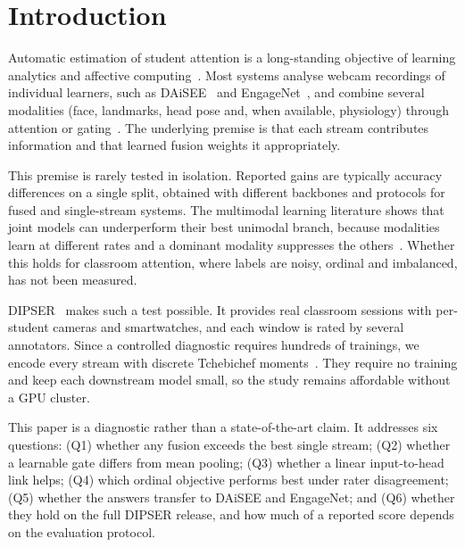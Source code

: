 \section{Introduction}
\label{sec:intro}

Automatic estimation of student attention is a long-standing objective of learning analytics and affective computing~\cite{whitehill2014faces,chango2022datafusionmmla}. Most systems analyse webcam recordings of individual learners, such as DAiSEE~\cite{gupta2016daisee} and EngageNet~\cite{singh2023engagenet}, and combine several modalities (face, landmarks, head pose and, when available, physiology) through attention or gating~\cite{baltrusaitis2019multimodal,arevalo2017gated,tran2026ordinal}. The underlying premise is that each stream contributes information and that learned fusion weights it appropriately.

This premise is rarely tested in isolation. Reported gains are typically accuracy differences on a single split, obtained with different backbones and protocols for fused and single-stream systems. The multimodal learning literature shows that joint models can underperform their best unimodal branch, because modalities learn at different rates and a dominant modality suppresses the others~\cite{wang2020makes,peng2022balanced}. Whether this holds for classroom attention, where labels are noisy, ordinal and imbalanced, has not been measured.

DIPSER~\cite{marquezcarpintero2025dipser} makes such a test possible. It provides real classroom sessions with per-student cameras and smartwatches, and each window is rated by several annotators. Since a controlled diagnostic requires hundreds of trainings, we encode every stream with discrete Tchebichef moments~\cite{mukundan2001tchebichef}. They require no training and keep each downstream model small, so the study remains affordable without a GPU cluster.

This paper is a diagnostic rather than a state-of-the-art claim. It addresses six questions: (Q1) whether any fusion exceeds the best single stream; (Q2) whether a learnable gate differs from mean pooling; (Q3) whether a linear input-to-head link helps; (Q4) which ordinal objective performs best under rater disagreement; (Q5) whether the answers transfer to DAiSEE and EngageNet; and (Q6) whether they hold on the full DIPSER release, and how much of a reported score depends on the evaluation protocol.

